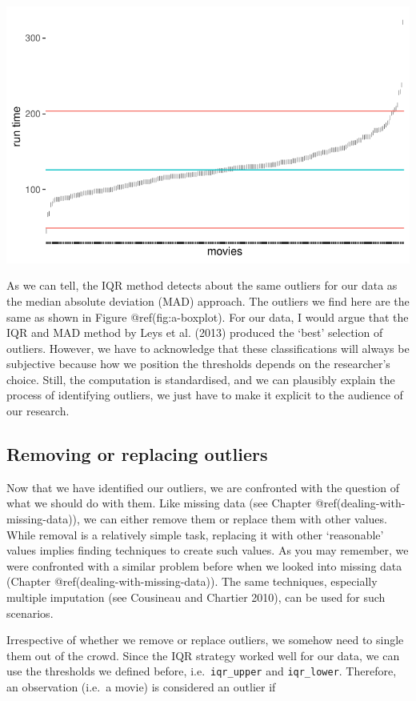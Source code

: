 \documentclass[
  letterpaper,
]{krantz}
\begin{document}
\includegraphics{09_sources_of_bias_files/figure-pdf/iqr-threshold-1.pdf}

As we can tell, the IQR method detects about the same outliers for our
data as the median absolute deviation (MAD) approach. The outliers we
find here are the same as shown in Figure @ref(fig:a-boxplot). For our
data, I would argue that the IQR and MAD method by Leys et al. (2013)
produced the `best' selection of outliers. However, we have to
acknowledge that these classifications will always be subjective because
how we position the thresholds depends on the researcher's choice.
Still, the computation is standardised, and we can plausibly explain the
process of identifying outliers, we just have to make it explicit to the
audience of our research.

\subsection{Removing or replacing
outliers}\label{removing-or-replacing-outliers}

Now that we have identified our outliers, we are confronted with the
question of what we should do with them. Like missing data (see Chapter
@ref(dealing-with-missing-data)), we can either remove them or replace
them with other values. While removal is a relatively simple task,
replacing it with other `reasonable' values implies finding techniques
to create such values. As you may remember, we were confronted with a
similar problem before when we looked into missing data (Chapter
@ref(dealing-with-missing-data)). The same techniques, especially
multiple imputation (see Cousineau and Chartier 2010), can be used for
such scenarios.

Irrespective of whether we remove or replace outliers, we somehow need
to single them out of the crowd. Since the IQR strategy worked well for
our data, we can use the thresholds we defined before,
i.e.~\texttt{iqr\_upper} and \texttt{iqr\_lower}. Therefore, an
observation (i.e.~a movie) is considered an outlier if
\end{document}

